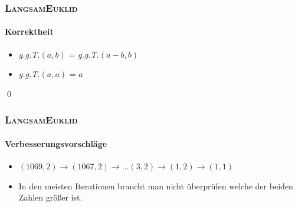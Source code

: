 \documentclass[•]{beamer}
\begin{document}
\begin{frame}
	\frametitle{\textsc{LangsamEuklid}}
	\framesubtitle{Korrektheit}
	\begin{itemize}
	\item \textit{g.g.T.}$(a,b)$ = \textit{g.g.T.}$(a-b,b)$
	\item \textit{g.g.T.}$(a,a)$ = $a$
	\end{itemize}
\qed
\end{frame}
\begin{frame}
	\frametitle{\textsc{LangsamEuklid}}
	\framesubtitle{Verbesserungsvorschl\"age}
	\begin{itemize}
	\item $(1069,2) \rightarrow (1067,2) \rightarrow \dots (3,2) \rightarrow (1,2) \rightarrow (1,1)$
	\item In den meisten Iterationen braucht man nicht \"uberpr\"ufen welche der beiden Zahlen gr\"o{\ss}er ist.
	\end{itemize}
\end{frame}
\end{document}
